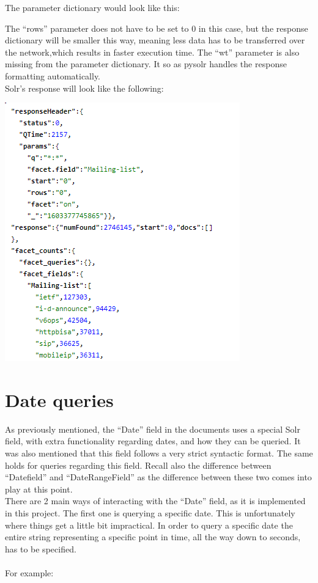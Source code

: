 \documentclass[a4paper,english]{report}
\begin{document}
The parameter dictionary would look like this: 



The “rows” parameter does not have to be set to 0 in this case, but the response dictionary will be smaller this way, meaning less data has to be transferred over the network,which results in faster execution time. The “wt” parameter is also missing from the parameter dictionary.  It so as pysolr handles the response formatting automatically.\\

Solr’s response will look like the following: 

\includegraphics{gui4}

\section{Date queries}

As previously mentioned, the “Date” field in the documents uses a special Solr field, with extra functionality regarding dates, and how they can be queried. It was also mentioned that this field follows a very strict syntactic format. The same holds for queries regarding this field. Recall also the difference between “Datefield” and “DateRangeField” as the difference between these two comes into play at this point.\\ 
There are 2 main ways of interacting with the “Date” field, as it is implemented in this project.
The first one is querying a specific date. This is unfortunately where things get a little bit impractical. In order to query a specific date the entire string representing a specific point in time, all the way down to seconds, has to be specified.\\\\
For example: \\
\end{document}
